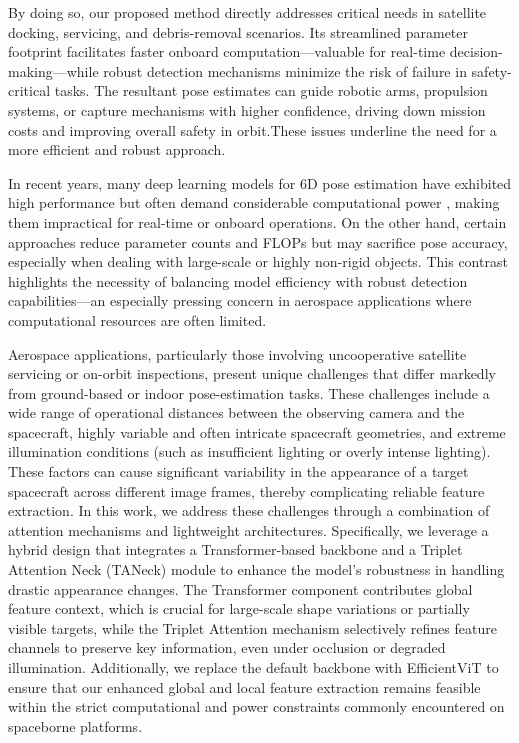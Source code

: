 \documentclass[a4paper,fleqn]{cas-sc}
\begin{document}
By doing so, our proposed method directly addresses critical needs in satellite docking, servicing, 
and debris-removal scenarios. Its streamlined parameter footprint facilitates faster onboard 
computation—valuable for real-time decision-making—while robust detection mechanisms minimize 
the risk of failure in safety-critical tasks. The resultant pose estimates can guide robotic arms, 
propulsion systems, or capture mechanisms with higher confidence, driving down mission costs and 
improving overall safety in orbit.These issues underline the need for a more efficient and robust approach.

In recent years, many deep learning models for 6D pose estimation have exhibited high performance 
but often demand considerable computational power \citep{Pavlakos_2017_ICRA,He_2020_CVPR, peng2019pvnet}, 
making them impractical for real-time or onboard operations. On the other hand, certain approaches 
reduce parameter counts and FLOPs \citep{Zhao_2020_CVPR} but may sacrifice pose accuracy, especially 
when dealing with large-scale or highly non-rigid objects. This contrast highlights the necessity 
of balancing model efficiency with robust detection capabilities—an especially pressing concern in 
aerospace applications where computational resources are often limited.

Aerospace applications, particularly those involving uncooperative satellite servicing or on-orbit inspections, present unique challenges that differ markedly from ground-based or indoor pose-estimation tasks. These challenges include a wide range of operational distances between the observing camera and the spacecraft, highly variable and often intricate spacecraft geometries, and extreme illumination conditions (such as insufficient lighting or overly intense lighting). These factors can cause significant variability in the appearance of a target spacecraft across different image frames, thereby complicating reliable feature extraction. In this work, we address these challenges through a combination of attention mechanisms and lightweight architectures. Specifically, we leverage a hybrid design that integrates a Transformer-based backbone and a Triplet Attention Neck (TANeck) module to enhance the model’s robustness in handling drastic appearance changes. The Transformer component contributes global feature context, which is crucial for large-scale shape variations or partially visible targets, while the Triplet Attention mechanism selectively refines feature channels to preserve key information, even under occlusion or degraded illumination. Additionally, we replace the default backbone with EfficientViT to ensure that our enhanced global and local feature extraction remains feasible within the strict computational and power constraints commonly encountered on spaceborne platforms. 
\end{document}
